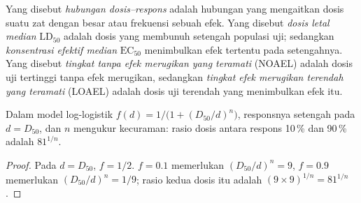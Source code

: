 \begin{definition}\label{def:b3:environmental-toxicology:dose}
Yang disebut \emph{hubungan dosis--respons} adalah hubungan yang mengaitkan
dosis suatu zat dengan besar atau frekuensi sebuah efek. Yang disebut \emph{dosis letal
median} $\mathrm{LD_{50}}$ adalah dosis yang membunuh setengah populasi uji; sedangkan
\emph{konsentrasi efektif median} $\mathrm{EC_{50}}$
menimbulkan efek tertentu pada setengahnya. Yang disebut \emph{tingkat tanpa efek merugikan yang
teramati} (NOAEL) adalah dosis uji tertinggi
tanpa efek merugikan, sedangkan \emph{tingkat efek merugikan terendah yang
teramati} (LOAEL) adalah dosis uji terendah
yang menimbulkan efek itu.
\end{definition}

\begin{proposition}\label{prop:b3:environmental-toxicology:dose-response}
Dalam model log-logistik $f(d) = 1/\bigl(1 + (D_{50}/d)^n\bigr)$, responsnya setengah pada $d = D_{50}$, dan $n$
mengukur kecuraman: rasio dosis antara respons 10\,\% dan 90\,\% adalah $81^{1/n}$.
\end{proposition}

\begin{proof}
Pada $d = D_{50}$, $f = 1/2$. $f = 0.1$ memerlukan $(D_{50}/d)^n = 9$, $f = 0.9$ memerlukan $(D_{50}/d)^n = 1/9$; rasio kedua dosis
itu adalah $(9 \times 9)^{1/n} = 81^{1/n}$.
\end{proof}


